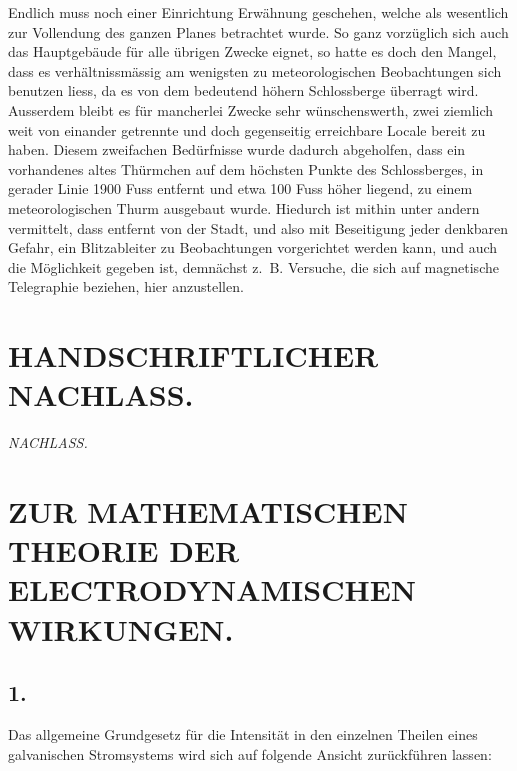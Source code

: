 \documentclass[fontsize=10pt,paper=a5,pagesize=auto]{scrbook}
\newcommand{\origpage}[1]{\marginpar{\footnotesize\textit{S. #1}}}
\begin{document}
Endlich muss noch einer Einrichtung Erwähnung geschehen, welche als wesentlich zur Vollendung des ganzen Planes betrachtet wurde. So ganz vorzüglich sich auch das Hauptgebäude für alle übrigen Zwecke eignet, so hatte es doch den Mangel, dass es verhältnissmässig am wenigsten zu meteorologischen Beobachtungen sich benutzen liess, da es von dem bedeutend höhern Schlossberge überragt wird. Ausserdem bleibt es für mancherlei Zwecke sehr wünschenswerth, zwei ziemlich weit von einander getrennte und doch gegenseitig erreichbare Locale bereit zu haben. Diesem zweifachen Bedürfnisse wurde dadurch abgeholfen, dass ein vorhandenes altes Thürmchen auf dem höchsten Punkte des Schlossberges, in gerader Linie 1900 Fuss entfernt und etwa 100 Fuss höher liegend, zu einem meteorologischen Thurm ausgebaut wurde. Hiedurch ist mithin unter andern vermittelt, dass entfernt von der Stadt, und also mit Beseitigung jeder denkbaren Gefahr, ein Blitzableiter zu Beobachtungen vorgerichtet werden kann, und auch die Möglichkeit gegeben ist, demnächst z.~B. Versuche, die sich auf magnetische Telegraphie beziehen, hier anzustellen.

\newpage
\section*{HANDSCHRIFTLICHER NACHLASS.}
\label{sec:nachlass}

\vfill
\begin{center}
\textit{NACHLASS.}
\end{center}
\vfill
\newpage

\section*{ZUR MATHEMATISCHEN THEORIE DER ELECTRODYNAMISCHEN WIRKUNGEN.}
\label{sec:electrodynamik}

\subsection*{1.}
\origpage{601}
Das allgemeine Grundgesetz für die Intensität in den einzelnen Theilen eines galvanischen Stromsystems wird sich auf folgende Ansicht zurückführen lassen:
\end{document}
